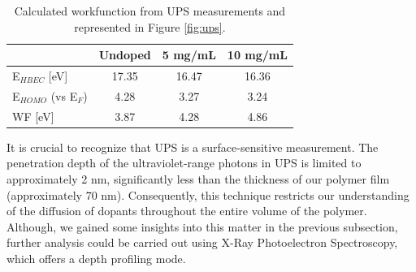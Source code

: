 \begin{table}[ht]
\centering
\caption{Calculated workfunction from UPS measurements and represented in Figure \ref{fig:ups}.}
\begin{tabular}{l|c|c|c}
& Undoped & 5 mg/mL & 10 mg/mL \\\hline
E$_{HBEC}$ [eV] & 17.35 & 16.47 & 16.36\\
E$_{HOMO}$ (vs E$_{F}$) & 4.28 & 3.27 & 3.24\\
WF [eV] & 3.87 & 4.28 & 4.86\\\hline
\end{tabular}
\label{tab:ups}
\end{table}

It is crucial to recognize that UPS is a surface-sensitive measurement. The penetration depth of the ultraviolet-range photons in UPS is limited to approximately 2 nm, significantly less than the thickness of our polymer film (approximately 70 nm). Consequently, this technique restricts our understanding of the diffusion of dopants throughout the entire volume of the polymer. Although, we gained some insights into this matter in the previous subsection, further analysis could be carried out using X-Ray Photoelectron Spectroscopy, which offers a depth profiling mode. %

